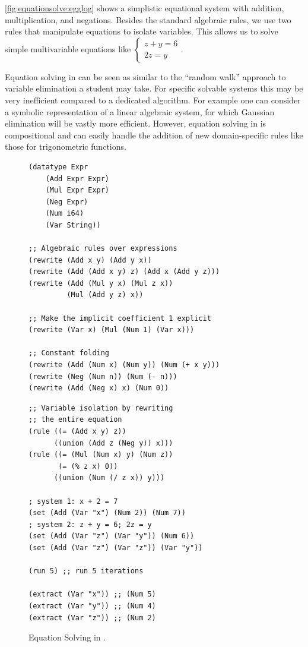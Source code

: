 \autoref{fig:equationsolve:egglog} shows a simplistic equational system
 with addition, multiplication, and negations.
Besides the standard algebraic rules,
 we use two rules that manipulate equations to isolate variables.
This allows us to solve simple multivariable equations
 like $\begin{cases}
    z+y=6\\
    2z=y
 \end{cases}$.

Equation solving in \egglog can be seen as similar to the ``random walk'' approach to
 variable elimination a student may take. For specific solvable systems this may
 be very inefficient compared to a dedicated algorithm.
 For example one can
 consider a symbolic representation of a linear algebraic system,
 for which Gaussian elimination will be vastly more efficient.
However, equation solving in \egglog is
 compositional and
 can easily handle the addition of new domain-specific rules
 like those for trigonometric functions.

\begin{figure}
\begin{minipage}[t]{0.48\linewidth}
    \begin{lstlisting}[language=egglog]
(datatype Expr
    (Add Expr Expr)
    (Mul Expr Expr)
    (Neg Expr)
    (Num i64)
    (Var String))

;; Algebraic rules over expressions
(rewrite (Add x y) (Add y x))
(rewrite (Add (Add x y) z) (Add x (Add y z)))
(rewrite (Add (Mul y x) (Mul z x))
         (Mul (Add y z) x))

;; Make the implicit coefficient 1 explicit
(rewrite (Var x) (Mul (Num 1) (Var x)))

;; Constant folding
(rewrite (Add (Num x) (Num y)) (Num (+ x y)))
(rewrite (Neg (Num n)) (Num (- n)))
(rewrite (Add (Neg x) x) (Num 0))
    \end{lstlisting}
\end{minipage}
\hfill
\begin{minipage}[t]{0.48\linewidth}
    \begin{lstlisting}[language=egglog]
;; Variable isolation by rewriting
;; the entire equation
(rule ((= (Add x y) z))
      ((union (Add z (Neg y)) x)))
(rule ((= (Mul (Num x) y) (Num z))
       (= (% z x) 0))
      ((union (Num (/ z x)) y)))

; system 1: x + 2 = 7
(set (Add (Var "x") (Num 2)) (Num 7))
; system 2: z + y = 6; 2z = y
(set (Add (Var "z") (Var "y")) (Num 6))
(set (Add (Var "z") (Var "z")) (Var "y"))

(run 5) ;; run 5 iterations

(extract (Var "x")) ;; (Num 5)
(extract (Var "y")) ;; (Num 4)
(extract (Var "z")) ;; (Num 2)
    \end{lstlisting}
\end{minipage}
    \caption{Equation Solving in \egglog.}
    \label{fig:equationsolve:egglog}
\end{figure}


